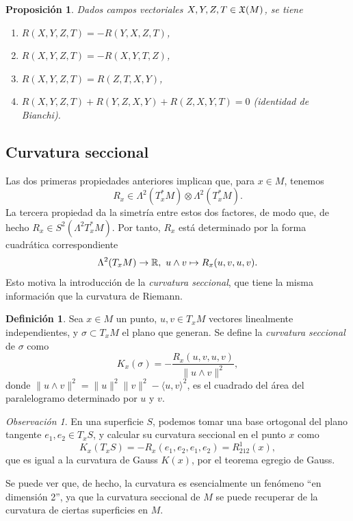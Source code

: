 \documentclass[11pt,a4paper]{amsbook}
\newtheorem{prop}[subsection]{Proposición}
\theoremstyle{remark} \newtheorem{rmk}[subsection]{Observación}
\theoremstyle{definition} \newtheorem{defn}[subsection]{Definición}
\theoremstyle{definition} \newtheorem{ex}[subsection]{Ejemplo}
\theoremstyle{definition} \newtheorem{ej}[subsection]{Ejercicio}
\begin{document}
\begin{prop}
  Dados campos vectoriales $X,Y,Z,T\in \mathfrak X(M)$, se tiene
  \begin{enumerate}
    \item $R(X,Y,Z,T)=-R(Y,X,Z,T)$,
    \item $R(X,Y,Z,T)=-R(X,Y,T,Z)$,
    \item $R(X,Y,Z,T)=R(Z,T,X,Y)$,
    \item $R(X,Y,Z,T)+R(Y,Z,X,Y) + R(Z,X,Y,T)=0$ (\emph{identidad de Bianchi}).
  \end{enumerate}
\end{prop}

\subsection{Curvatura seccional} Las dos primeras propiedades anteriores implican que, para $x\in M$, tenemos \[R_x \in \Lambda^2(T^*_xM) \otimes \Lambda^2(T^*_xM).\] La tercera propiedad da la simetría entre estos dos factores, de modo que, de hecho $R_x \in S^2(\Lambda^2 T_x^*M)$. Por tanto, $R_x$ está determinado por la forma cuadrática correspondiente
\begin{equation*}
\Lambda^2(T_xM) \rightarrow \mathbb R,\  u\wedge v \mapsto R_x(u,v,u,v).
\end{equation*}
Esto motiva la introducción de la \emph{curvatura seccional}, que tiene la misma información que la curvatura de Riemann.

\begin{defn}
  Sea $x\in M$ un punto, $u,v \in T_xM$ vectores linealmente independientes, y $\sigma \subset T_xM$ el plano que generan. Se define la \emph{curvatura seccional} de $\sigma$ como
  \begin{equation*}
K_x(\sigma) = -\frac{R_x(u,v,u,v)}{\lVert u \wedge v \rVert^2},
  \end{equation*}
  donde $\lVert u \wedge v \rVert^2 = \lVert u\rVert^2\lVert v\rVert^2- \langle u,v \rangle^2$, es el cuadrado del área del paralelogramo determinado por $u$ y $v$.
\end{defn}

\begin{rmk}
  En una superficie $S$, podemos tomar una base ortogonal del plano tangente $e_1,e_2\in T_xS$, y calcular su curvatura seccional en el punto $x$ como
  \begin{equation*}
K_x(T_xS) = -R_x(e_1,e_2,e_1,e_2) = R^1_{212}(x),
  \end{equation*}
que es igual a la curvatura de Gauss $K(x)$, por el teorema egregio de Gauss.

Se puede ver que, de hecho, la curvatura es esencialmente un fenómeno ``en dimensión 2'', ya que la curvatura seccional de $M$ se puede recuperar de la curvatura de ciertas superficies en $M$.
\end{rmk}
\end{document}
